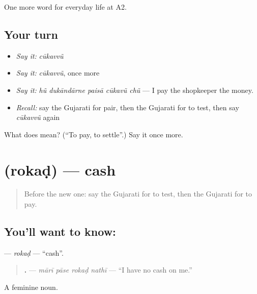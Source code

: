 \begin{grammarlens}[title={What you've built}]
One more word for everyday life at A2.
\end{grammarlens}

\subsection*{Your turn}
\begin{itemize}
\raggedright
  \item \emph{Say it:} \emph{cūkavvũ}
  \item \emph{Say it:} \emph{cūkavvũ}, once more
  \item \emph{Say it:} \emph{hũ dukāndārne paisā cūkavũ chũ} — I pay the shopkeeper the money.
  \item \emph{Recall:} say the Gujarati for pair, then the Gujarati for to test, then say \emph{cūkavvũ} again
\end{itemize}

\begin{tcolorbox}[breakable,colback=teal!4,colframe=teal!35!black,title={Before you move on}]
What does  mean? (\textquotedblleft{}To pay, to settle\textquotedblright{}.) Say it once more.
\end{tcolorbox}
\section[\texorpdfstring{\gu{રોકડ} (rokaḍ)}{રોકડ (rokaḍ)}]{ (rokaḍ) — cash}

\label{lesson:GU-C186-rokad}



\begin{quote}
Before the new one: say the Gujarati for to test, then the Gujarati for to pay.
\end{quote}

\subsection*{You'll want to know: }
\textbf{} — \emph{rokaḍ} — \textquotedblleft{}cash\textquotedblright{}.

\begin{quote}
\textbf{   .} — \emph{mārī pāse rokaḍ nathī} — \textquotedblleft{}I have no cash on me.\textquotedblright{}
\end{quote}

A feminine noun.

